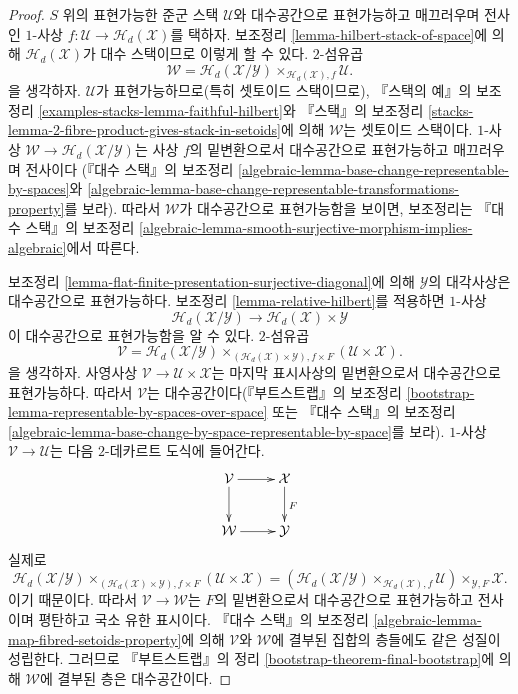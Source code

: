 \begin{proof}
$S$ 위의 표현가능한 준군 스택 $\mathcal{U}$와 대수공간으로
표현가능하고 매끄러우며 전사인 $1$-사상
$f : \mathcal{U} \to \mathcal{H}_d(\mathcal{X})$를 택하자.
보조정리 \ref{lemma-hilbert-stack-of-space}에 의해
$\mathcal{H}_d(\mathcal{X})$가 대수 스택이므로 이렇게 할 수 있다.
$2$-섬유곱
$$
\mathcal{W} =
\mathcal{H}_d(\mathcal{X}/\mathcal{Y})
\times_{\mathcal{H}_d(\mathcal{X}), f}
\mathcal{U}.
$$
을 생각하자. $\mathcal{U}$가 표현가능하므로(특히 셋토이드 스택이므로),
『스택의 예』의 보조정리 \ref{examples-stacks-lemma-faithful-hilbert}와
『스택』의 보조정리
\ref{stacks-lemma-2-fibre-product-gives-stack-in-setoids}에 의해
$\mathcal{W}$는 셋토이드 스택이다. $1$-사상
$\mathcal{W} \to \mathcal{H}_d(\mathcal{X}/\mathcal{Y})$는 사상 $f$의
밑변환으로서 대수공간으로 표현가능하고 매끄러우며 전사이다
(『대수 스택』의 보조정리
\ref{algebraic-lemma-base-change-representable-by-spaces}와
\ref{algebraic-lemma-base-change-representable-transformations-property}를 보라).
따라서 $\mathcal{W}$가 대수공간으로 표현가능함을 보이면, 보조정리는
『대수 스택』의 보조정리
\ref{algebraic-lemma-smooth-surjective-morphism-implies-algebraic}에서 따른다.

\medskip\noindent
보조정리 \ref{lemma-flat-finite-presentation-surjective-diagonal}에 의해
$\mathcal{Y}$의 대각사상은 대수공간으로 표현가능하다.
보조정리 \ref{lemma-relative-hilbert}를 적용하면 $1$-사상
$$
\mathcal{H}_d(\mathcal{X}/\mathcal{Y})
\longrightarrow
\mathcal{H}_d(\mathcal{X}) \times \mathcal{Y}
$$
이 대수공간으로 표현가능함을 알 수 있다. $2$-섬유곱
$$
\mathcal{V} =
\mathcal{H}_d(\mathcal{X}/\mathcal{Y})
\times_{(\mathcal{H}_d(\mathcal{X}) \times \mathcal{Y}), f \times F}
(\mathcal{U} \times \mathcal{X}).
$$
을 생각하자. 사영사상 $\mathcal{V} \to \mathcal{U} \times \mathcal{X}$는
마지막 표시사상의 밑변환으로서 대수공간으로 표현가능하다. 따라서
$\mathcal{V}$는 대수공간이다(『부트스트랩』의 보조정리
\ref{bootstrap-lemma-representable-by-spaces-over-space} 또는
『대수 스택』의 보조정리
\ref{algebraic-lemma-base-change-by-space-representable-by-space}를 보라).
$1$-사상 $\mathcal{V} \to \mathcal{U}$는 다음 $2$-데카르트 도식에 들어간다.
$$
\xymatrix{
\mathcal{V} \ar[d] \ar[r] & \mathcal{X} \ar[d]^F \\
\mathcal{W} \ar[r] & \mathcal{Y}
}
$$
실제로
$$
\mathcal{H}_d(\mathcal{X}/\mathcal{Y})
\times_{(\mathcal{H}_d(\mathcal{X}) \times \mathcal{Y}), f \times F}
(\mathcal{U} \times \mathcal{X})
=
(\mathcal{H}_d(\mathcal{X}/\mathcal{Y})
\times_{\mathcal{H}_d(\mathcal{X}), f}
\mathcal{U}) \times_{\mathcal{Y}, F} \mathcal{X}.
$$
이기 때문이다. 따라서 $\mathcal{V} \to \mathcal{W}$는 $F$의
밑변환으로서 대수공간으로 표현가능하고 전사이며 평탄하고
국소 유한 표시이다. 『대수 스택』의 보조정리
\ref{algebraic-lemma-map-fibred-setoids-property}에 의해
$\mathcal{V}$와 $\mathcal{W}$에 결부된 집합의 층들에도 같은 성질이
성립한다. 그러므로 『부트스트랩』의 정리
\ref{bootstrap-theorem-final-bootstrap}에 의해 $\mathcal{W}$에
결부된 층은 대수공간이다.
\end{proof}




